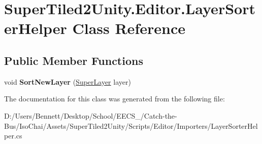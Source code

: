 \hypertarget{class_super_tiled2_unity_1_1_editor_1_1_layer_sorter_helper}{}\section{Super\+Tiled2\+Unity.\+Editor.\+Layer\+Sorter\+Helper Class Reference}
\label{class_super_tiled2_unity_1_1_editor_1_1_layer_sorter_helper}
\subsection*{Public Member Functions}
\begin{DoxyCompactItemize}
\item 
\mbox{\label{class_super_tiled2_unity_1_1_editor_1_1_layer_sorter_helper_aca6196c5c5ddf8c8d338536cf60f501f}} 
void {\bfseries Sort\+New\+Layer} (\mbox{\hyperlink{class_super_tiled2_unity_1_1_super_layer}{Super\+Layer}} layer)
\end{DoxyCompactItemize}


The documentation for this class was generated from the following file\+:\begin{DoxyCompactItemize}
\item 
D\+:/\+Users/\+Bennett/\+Desktop/\+School/\+E\+E\+C\+S\+\_/\+Catch-\/the-\/\+Bus/\+Iso\+Chai/\+Assets/\+Super\+Tiled2\+Unity/\+Scripts/\+Editor/\+Importers/Layer\+Sorter\+Helper.\+cs\end{DoxyCompactItemize}
